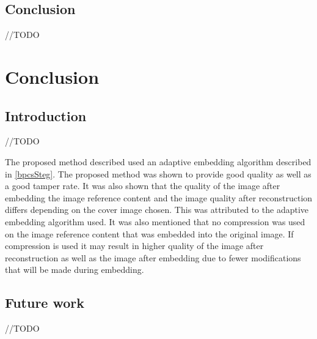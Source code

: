 \documentclass[12pt]{article}
\begin{document}
\subsection{Conclusion}
//TODO 

\section{Conclusion}
\subsection{Introduction}
//TODO 

The proposed method described used an adaptive embedding algorithm described in \ref{bpcsSteg}.
The proposed method was shown to provide good quality as well as a good tamper rate.
It was also shown that the quality of the image after embedding the image reference content and the image quality after reconstruction differs depending on the cover image chosen.
This was attributed to the adaptive embedding algorithm used.
It was also mentioned that no compression was used on the image reference content that was embedded into the original image.
If compression is used it may result in higher quality of the image after reconstruction as well as the image after embedding due to fewer modifications that will be made during embedding.

\subsection{Future work}
//TODO 



\end{document}
